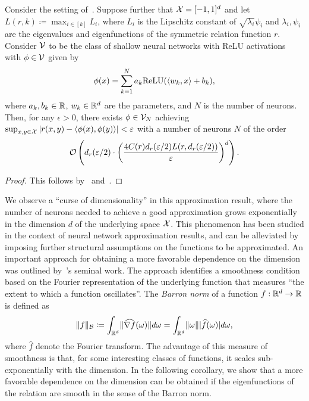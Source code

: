 \begin{corollary}\label{cor:sym_iprod_kernel_neuron_bound}
	Consider the setting of~. Suppose further that ${\mathcal{X}} = [-1, 1]^d$ and let $L(r, k) \coloneq \max_{i \in [k]} L_i$, where $L_i$ is the Lipschitz constant of $\sqrt{\lambda_i} \psi_i$ and $\lambda_i, \psi_i$ are the eigenvalues and eigenfunctions of the symmetric relation function $r$. Consider ${\mathcal{V}}$ to be the class of shallow neural networks with ReLU activations with $\phi \in {\mathcal{V}}$ given by
	\begin{equation*}
		\phi(x) = \sum_{k=1}^{N} a_k \mathrm{ReLU}(\iprod{w_k}{x} + b_k),
	\end{equation*}
	where $a_k, b_k \in \mathbb{R}$, $w_k \in \mathbb{R}^{d}$ are the parameters, and $N$ is the number of neurons. Then, for any $\epsilon > 0$, there exists $\phi \in {\mathcal{V}}_N$ achieving $\sup_{x,y \in \mathcal{X}}{\left\lvert r(x,y) - \left \langle \phi(x), \phi(y) \right\rangle\right\rvert} < \varepsilon$ with a number of neurons $N$ of the order
	\[{\mathcal{O}}\left(d_r(\varepsilon / 2) \cdot \left(\frac{4 C(r) d_r(\varepsilon / 2) L(r, d_r(\varepsilon/2))}{\varepsilon}\right)^{d}\right).\]
\end{corollary}
\begin{proof}
	This follows by~ and~\textcite{bachBreakingCurseDimensionality2016}.
\end{proof}

We observe a ``curse of dimensionality'' in this approximation result, where the number of neurons needed to achieve a good approximation grows exponentially in the dimension $d$ of the underlying space ${\mathcal{X}}$. This phenomenon has been studied in the context of neural network approximation results, and can be alleviated by imposing further structural assumptions on the functions to be approximated. An important approach for obtaining a more favorable dependence on the dimension was outlined by~\textcite{barronUniversalApproximation1993}'s seminal work. The approach identifies a smoothness condition based on the Fourier representation of the underlying function that measures ``the extent to which a function oscillates''. The \textit{Barron norm} of a function $f: \mathbb{R}^d \to \mathbb{R}$ is defined as
\[\lVert f\rVert_{{\mathcal{B}}} \coloneq \int_{\mathbb{R}^d} \lVert\widehat{\nabla f}(\omega)\rVert d\omega = \int_{\mathbb{R}^d} \lVert\omega\rVert \lvert\widehat{f}(\omega)\rvert d \omega,\]
where $\hat{f}$ denote the Fourier transform. The advantage of this measure of smoothness is that, for some interesting classes of functions, it scales sub-exponentially with the dimension. In the following corollary, we show that a more favorable dependence on the dimension can be obtained if the eigenfunctions of the relation are smooth in the sense of the Barron norm.

